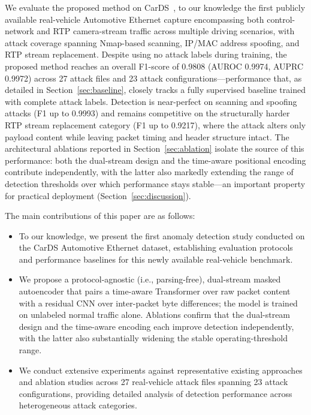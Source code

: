 We evaluate the proposed method on CarDS~\cite{hellemans2025cards}, to our knowledge the first publicly available real-vehicle Automotive Ethernet capture encompassing both control-network and RTP camera-stream traffic across multiple driving scenarios, with attack coverage spanning Nmap-based scanning, IP/MAC address spoofing, and RTP stream replacement. Despite using no attack labels during training, the proposed method reaches an overall F1-score of 0.9808 (AUROC 0.9974, AUPRC 0.9972) across 27 attack files and 23 attack configurations---performance that, as detailed in Section~\ref{sec:baseline}, closely tracks a fully supervised baseline trained with complete attack labels. Detection is near-perfect on scanning and spoofing attacks (F1 up to 0.9993) and remains competitive on the structurally harder RTP stream replacement category (F1 up to 0.9217), where the attack alters only payload content while leaving packet timing and header structure intact. The architectural ablations reported in Section~\ref{sec:ablation} isolate the source of this performance: both the dual-stream design and the time-aware positional encoding contribute independently, with the latter also markedly extending the range of detection thresholds over which performance stays stable---an important property for practical deployment (Section~\ref{sec:discussion}).

The main contributions of this paper are as follows:
\begin{itemize}
\item To our knowledge, we present the first anomaly detection study conducted on the CarDS Automotive Ethernet dataset, establishing evaluation protocols and performance baselines for this newly available real-vehicle benchmark.

\item We propose a protocol-agnostic (i.e., parsing-free), dual-stream masked autoencoder that pairs a time-aware Transformer over raw packet content with a residual CNN over inter-packet byte differences; the model is trained on unlabeled normal traffic alone. Ablations confirm that the dual-stream design and the time-aware encoding each improve detection independently, with the latter also substantially widening the stable operating-threshold range.

\item We conduct extensive experiments against representative existing approaches and ablation studies across 27 real-vehicle attack files spanning 23 attack configurations, providing detailed analysis of detection performance across heterogeneous attack categories.
\end{itemize}

